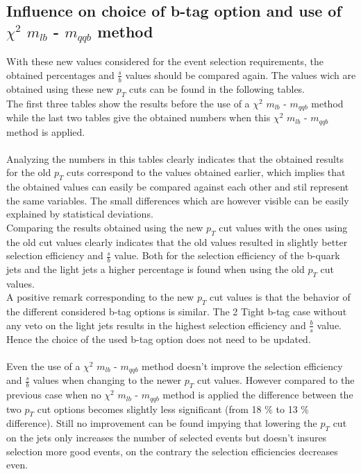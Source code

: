 \documentclass[a4paper,12pt]{report}
\begin{document}
\subsection{Influence on choice of b-tag option and use of $\chi^{2}$ $m_{lb}$ - $m_{qqb}$ method}
With these new values considered for the event selection requirements, the obtained percentages and $\frac{s}{b}$ values should be compared again.
The values wich are obtained using these new $p_T$ cuts can be found in the following tables.\\
The first three tables show the results before the use of a $\chi^{2}$ $m_{lb}$ - $m_{qqb}$ method while the last two tables give the obtained numbers when this $\chi^{2}$ $m_{lb}$ - $m_{qqb}$ method is applied.\\
\\
Analyzing the numbers in this tables clearly indicates that the obtained results for the old $p_T$ cuts correspond to the values obtained earlier, which implies that the obtained values can easily be compared against each other and stil represent the same variables. The small differences which are however visible can be easily explained by statistical deviations.\\
Comparing the results obtained using the new $p_T$ cut values with the ones using the old cut values clearly indicates that the old values resulted in slightly better selection efficiency and $\frac{s}{b}$ value. Both for the selection efficiency of the b-quark jets and the light jets a higher percentage is found when using the old $p_T$ cut values. \\
A positive remark corresponding to the new $p_T$ cut values is that the behavior of the different considered b-tag options is similar. The 2 Tight b-tag case without any veto on the light jets results in the highest selection efficiency and $\frac{b}{s}$ value. Hence the choice of the used b-tag option does not need to be updated.\\
\\
Even the use of a $\chi^{2}$ $m_{lb}$ - $m_{qqb}$ method doesn't improve the selection efficiency and $\frac{s}{b}$ values when changing to the newer $p_T$ cut values. However compared to the previous case when no $\chi^{2}$ $m_{lb}$ - $m_{qqb}$ method is applied the difference between the two $p_T$ cut options becomes slightly less significant (from 18 $\%$ to 13 $\%$ difference). Still no improvement can be found impying that lowering the $p_T$ cut on the jets only increases the number of selected events but doesn't insures selection more good events, on the contrary the selection efficiencies decreases even.
\end{document}
